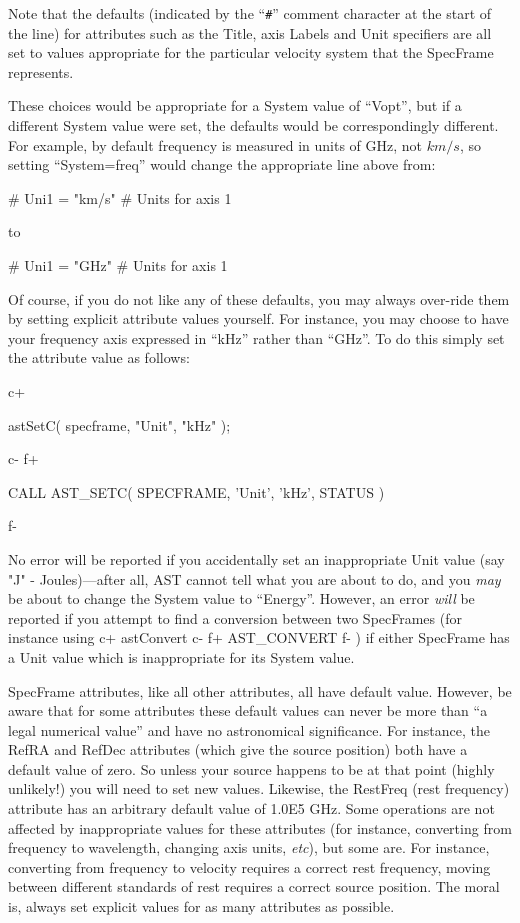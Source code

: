 \documentclass[twoside,11pt]{starlink}
\begin{document}
Note that the defaults (indicated by the ``\verb?#?'' comment
character at the start of the line) for attributes such as the Title,
axis Labels and Unit specifiers are all set to values appropriate
for the particular velocity system that the SpecFrame represents.

These choices would be appropriate for a System value of ``Vopt'',
but if a different System value were set, the defaults would be
correspondingly different. For example, by default frequency is measured in
units of GHz, not $km/s$, so setting ``System=freq''
would change the appropriate line above from:

\begin{terminalv}
#   Uni1 = "km/s"       # Units for axis 1
\end{terminalv}

to

\begin{terminalv}
#   Uni1 = "GHz"        # Units for axis 1
\end{terminalv}

Of course, if you do not like any of these defaults, you may always
over-ride them by setting explicit attribute values yourself. For
instance, you may choose to have your frequency axis expressed in ``kHz''
rather than ``GHz''. To do this simply set the attribute value as follows:

c+
\small
\begin{terminalv}
astSetC( specframe, "Unit", "kHz" );
\end{terminalv}
\normalsize
c-
f+
\small
\begin{terminalv}
      CALL AST_SETC( SPECFRAME, 'Unit', 'kHz', STATUS )
\end{terminalv}
\normalsize
f-

No error will be reported if you accidentally set an inappropriate Unit value
(say "J" - Joules)---after all, AST cannot tell what you are about to do,
and you \emph{may} be about to change the System value to ``Energy''.
However, an error \emph{will} be reported if you attempt to find a
conversion between two SpecFrames (for instance using
c+
astConvert
c-
f+
AST\_CONVERT
f-
) if either SpecFrame has a Unit value which is inappropriate for its
System value.

SpecFrame attributes, like all other attributes, all have default
value. However, be aware that for some attributes these default values
can never be more than ``a legal numerical value'' and have no
astronomical significance. For instance, the RefRA and RefDec attributes
(which give the source position) both have a default value of zero. So
unless your source happens to be at that point (highly unlikely!) you will
need to set new values. Likewise, the RestFreq (rest frequency) attribute
has an arbitrary default value of 1.0E5 GHz. Some operations are not
affected by inappropriate values for these attributes (for instance,
converting from frequency to wavelength, changing axis units, \emph{etc}),
but some are. For instance, converting from frequency to velocity
requires a correct rest frequency, moving between different standards of
rest requires a correct source position. The moral is, always set explicit
values for as many attributes as possible.
\end{document}
